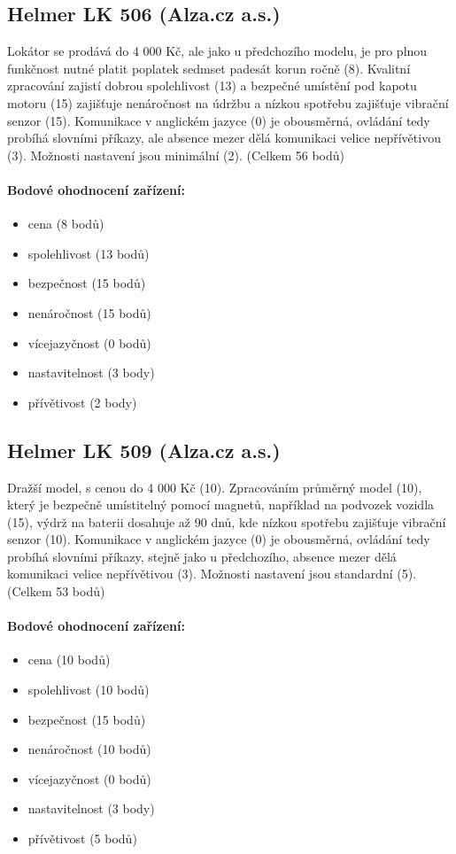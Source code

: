 \documentclass[FM,MP]{tulthesis}  %
\begin{document}
\subsection{Helmer LK 506 (Alza.cz a.s.)}
Lokátor se prodává do 4 000 Kč, ale jako u předchozího modelu, je pro plnou funkčnost nutné platit poplatek sedmset padesát korun ročně (8). Kvalitní zpracování zajistí dobrou spolehlivost (13) a bezpečné umístění pod kapotu motoru (15) zajišťuje nenáročnost na údržbu a nízkou spotřebu zajišťuje vibrační senzor (15). Komunikace v anglickém jazyce (0) je obousměrná, ovládání tedy probíhá slovními příkazy, ale absence mezer dělá komunikaci velice nepřívětivou (3). Možnosti nastavení jsou minimální (2). (Celkem 56 bodů)

\paragraph{Bodové ohodnocení zařízení:}
\begin{itemize}
\item cena (8 bodů)
\item spolehlivost (13 bodů)
\item bezpečnost (15 bodů)
\item nenáročnost (15 bodů)
\item vícejazyčnost (0 bodů)
\item nastavitelnost (3 body)
\item přívětivost (2 body)
\end{itemize}

\subsection{Helmer LK 509 (Alza.cz a.s.)}
Dražší model, s cenou do 4 000 Kč (10). Zpracováním průměrný model (10), který je bezpečně umístitelný pomocí magnetů, například na podvozek vozidla (15), výdrž na baterii dosahuje až 90 dnů, kde nízkou spotřebu zajišťuje vibrační senzor (10). Komunikace v anglickém jazyce (0) je obousměrná, ovládání tedy probíhá slovními příkazy, stejně jako u předchozího, absence mezer dělá komunikaci velice nepřívětivou (3). Možnosti nastavení jsou standardní (5). (Celkem 53 bodů)

\paragraph{Bodové ohodnocení zařízení:}
\begin{itemize}
\item cena (10 bodů)
\item spolehlivost (10 bodů)
\item bezpečnost (15 bodů)
\item nenáročnost (10 bodů)
\item vícejazyčnost (0 bodů)
\item nastavitelnost (3 body)
\item přívětivost (5 bodů)
\end{itemize}
\end{document}
